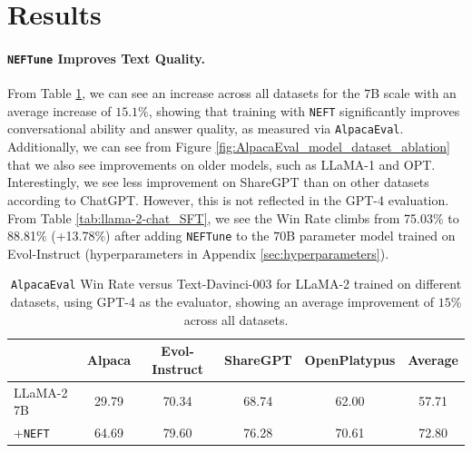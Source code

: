 \documentclass{article} %
\newcommand{\neft}{\texttt{NEFT}}
\newcommand{\neftune}{\texttt{NEFTune}}
\newcommand{\llama}{LLaMA}
\begin{document}
\section{Results} \label{sec:Results}

\paragraph{\neftune{} Improves Text Quality.}
From Table \ref{tab:LLaMA-2_GPT-4}, we can see an increase across all datasets for the $7$B scale with an average increase of $15.1\%$, showing that training with \neft{} significantly improves conversational ability and answer quality, as measured via \texttt{AlpacaEval}. Additionally, we can see from Figure \ref{fig:AlpacaEval_model_dataset_ablation} that we also see improvements on older models, such as \llama{}-1 and OPT. Interestingly, we see less improvement on ShareGPT than on other datasets according to ChatGPT. However, this is not reflected in the GPT-4 evaluation. From Table \ref{tab:llama-2-chat_SFT}, we see the Win Rate climbs from 75.03\% to 88.81\% (+13.78\%) after adding \neftune{} to the $70$B parameter model trained on Evol-Instruct (hyperparameters in Appendix \ref{sec:hyperparameters}).

\begin{table}[t]
\centering
\caption{\texttt{AlpacaEval} Win Rate versus Text-Davinci-003 for \llama{}-2 trained on different datasets, using GPT-4 as the evaluator, showing an average improvement of $15$\% across all datasets.}\label{tab:LLaMA-2_GPT-4}
\begin{tabular}{lccccc}
\toprule
            & Alpaca & Evol-Instruct & ShareGPT & OpenPlatypus & Average \\ \midrule
\llama{}-2 7B  & 29.79  & 70.34    & 68.74              & 62.00        & 57.71   \\ 
+\neft{}  & 64.69  & 79.60    & 76.28              & 70.61        & 72.80  \\ \bottomrule
\end{tabular}
\end{table}
\end{document}
